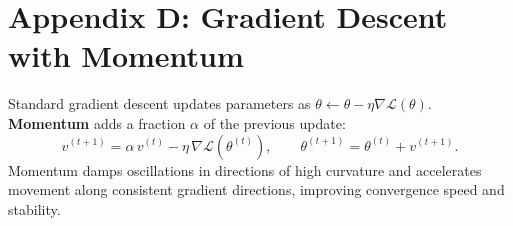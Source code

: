 \documentclass[11pt]{article}
\begin{document}
\section*{Appendix D: Gradient Descent with Momentum}

Standard gradient descent updates parameters as $\theta \leftarrow \theta - \eta
\nabla\mathcal{L}(\theta)$.
\textbf{Momentum} adds a fraction $\alpha$ of the previous update:
\[
  v^{(t+1)} = \alpha\,v^{(t)} - \eta\,\nabla\mathcal{L}(\theta^{(t)}),
  \qquad
  \theta^{(t+1)} = \theta^{(t)} + v^{(t+1)}.
\]
Momentum damps oscillations in directions of high curvature and accelerates
movement along consistent gradient directions, improving convergence speed and
stability.
\end{document}
